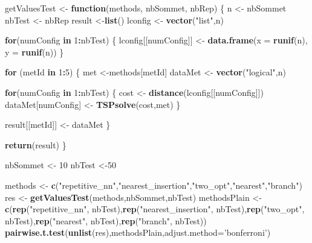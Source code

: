 \documentclass[
]{article}
\newenvironment{Shaded}{\begin{snugshade}}{\end{snugshade}}
\newcommand{\ControlFlowTok}[1]{\textcolor[rgb]{0.13,0.29,0.53}{\textbf{#1}}}
\newcommand{\DataTypeTok}[1]{\textcolor[rgb]{0.13,0.29,0.53}{#1}}
\newcommand{\DecValTok}[1]{\textcolor[rgb]{0.00,0.00,0.81}{#1}}
\newcommand{\KeywordTok}[1]{\textcolor[rgb]{0.13,0.29,0.53}{\textbf{#1}}}
\newcommand{\NormalTok}[1]{#1}
\newcommand{\OperatorTok}[1]{\textcolor[rgb]{0.81,0.36,0.00}{\textbf{#1}}}
\newcommand{\StringTok}[1]{\textcolor[rgb]{0.31,0.60,0.02}{#1}}
\begin{document}
\begin{Shaded}
\begin{Highlighting}[]
\NormalTok{  getValuesTest <-}\StringTok{ }\ControlFlowTok{function}\NormalTok{(methods, nbSommet, nbRep) \{}
\NormalTok{    n       <-}\StringTok{ }\NormalTok{nbSommet}
\NormalTok{    nbTest  <-}\StringTok{ }\NormalTok{nbRep}
\NormalTok{    result  <-}\KeywordTok{list}\NormalTok{()}
\NormalTok{    lconfig <-}\StringTok{ }\KeywordTok{vector}\NormalTok{(}\StringTok{"list"}\NormalTok{,n)}

    \ControlFlowTok{for}\NormalTok{(numConfig }\ControlFlowTok{in} \DecValTok{1}\OperatorTok{:}\NormalTok{nbTest) \{}
\NormalTok{      lconfig[[numConfig]] <-}\StringTok{ }\KeywordTok{data.frame}\NormalTok{(}\DataTypeTok{x =} \KeywordTok{runif}\NormalTok{(n), }\DataTypeTok{y =} \KeywordTok{runif}\NormalTok{(n))}
\NormalTok{    \}}

    \ControlFlowTok{for}\NormalTok{ (metId }\ControlFlowTok{in} \DecValTok{1}\OperatorTok{:}\DecValTok{5}\NormalTok{) \{}
\NormalTok{      met     <-methods[metId]}
\NormalTok{      dataMet <-}\StringTok{ }\KeywordTok{vector}\NormalTok{(}\StringTok{"logical"}\NormalTok{,n)}

      \ControlFlowTok{for}\NormalTok{(numConfig }\ControlFlowTok{in} \DecValTok{1}\OperatorTok{:}\NormalTok{nbTest) \{}
\NormalTok{        cost               <-}\StringTok{ }\KeywordTok{distance}\NormalTok{(lconfig[[numConfig]])}
\NormalTok{        dataMet[numConfig] <-}\StringTok{ }\KeywordTok{TSPsolve}\NormalTok{(cost,met)}
\NormalTok{      \}}
      
\NormalTok{      result[[metId]] <-}\StringTok{ }\NormalTok{dataMet}
\NormalTok{    \}}
      
    \KeywordTok{return}\NormalTok{(result)}
\NormalTok{  \}}

\NormalTok{  nbSommet     <-}\StringTok{ }\DecValTok{10}
\NormalTok{  nbTest       <-}\DecValTok{50}

\NormalTok{  methods      <-}\StringTok{ }\KeywordTok{c}\NormalTok{(}\StringTok{"repetitive_nn"}\NormalTok{,}\StringTok{"nearest_insertion"}\NormalTok{,}\StringTok{"two_opt"}\NormalTok{,}\StringTok{"nearest"}\NormalTok{,}\StringTok{"branch"}\NormalTok{)}
\NormalTok{  res          <-}\StringTok{ }\KeywordTok{getValuesTest}\NormalTok{(methods,nbSommet,nbTest)}
\NormalTok{  methodsPlain <-}\StringTok{ }\KeywordTok{c}\NormalTok{(}\KeywordTok{rep}\NormalTok{(}\StringTok{"repetitive_nn"}\NormalTok{, nbTest),}\KeywordTok{rep}\NormalTok{(}\StringTok{"nearest_insertion"}\NormalTok{, nbTest),}\KeywordTok{rep}\NormalTok{(}\StringTok{"two_opt"}\NormalTok{, nbTest),}\KeywordTok{rep}\NormalTok{(}\StringTok{"nearest"}\NormalTok{, nbTest),}\KeywordTok{rep}\NormalTok{(}\StringTok{"branch"}\NormalTok{, nbTest))}
  \KeywordTok{pairwise.t.test}\NormalTok{(}\KeywordTok{unlist}\NormalTok{(res),methodsPlain,}\DataTypeTok{adjust.method=}\StringTok{'bonferroni'}\NormalTok{)}
\end{Highlighting}
\end{Shaded}
\end{document}
